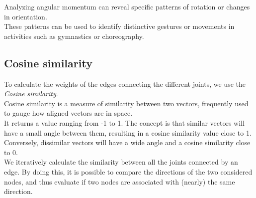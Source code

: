 Analyzing angular momentum can reveal specific patterns of rotation or changes in orientation. \\
These patterns can be used to identify distinctive gestures or movements in activities such as gymnastics or choreography.

\subsection{Cosine similarity}
To calculate the weights of the edges connecting the different joints, we use the \textit{Cosine similarity}. \\
Cosine similarity is a measure of similarity between two vectors, frequently used to gauge how aligned vectors are in space. \\
It returns a value ranging from -1 to 1.
The concept is that similar vectors will have a small angle between them, resulting in a cosine similarity value close to 1. \\
Conversely, dissimilar vectors will have a wide angle and a cosine similarity close to 0.\\
We iteratively calculate the similarity between all the joints connected by an edge.
By doing this, it is possible to compare the directions of the two considered nodes, and thus evaluate if two nodes are associated with
(nearly) the same direction.

